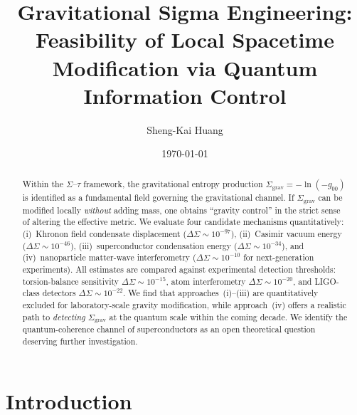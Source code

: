 \documentclass[prd,twocolumn,superscriptaddress,longbibliography,floatfix]{revtex4-2}
\newcommand{\tauasym}{\tau}
\newcommand{\Sgrav}{\Sigma_{\mathrm{grav}}}
\newcommand{\DSigma}{\Delta\Sigma}
\begin{document}
\title{Gravitational Sigma Engineering: Feasibility of Local Spacetime
Modification via Quantum Information Control}

\author{Sheng-Kai Huang}

\date{\today}

\begin{abstract}
Within the $\Sigma$--$\tauasym$ framework, the gravitational entropy
production $\Sgrav = -\ln(-g_{00})$ is identified as a fundamental
field governing the gravitational channel.  If $\Sgrav$ can be
modified locally \emph{without} adding mass, one obtains ``gravity
control'' in the strict sense of altering the effective metric.  We
evaluate four candidate mechanisms quantitatively: (i)~Khronon field
condensate displacement ($\DSigma \sim 10^{-97}$), (ii)~Casimir
vacuum energy ($\DSigma \sim 10^{-46}$), (iii)~superconductor
condensation energy ($\DSigma \sim 10^{-34}$), and (iv)~nanoparticle
matter-wave interferometry ($\DSigma \sim 10^{-10}$ for
next-generation experiments).  All estimates are compared against
experimental detection thresholds: torsion-balance sensitivity
$\DSigma \sim 10^{-15}$, atom interferometry $\DSigma \sim 10^{-20}$,
and LIGO-class detectors $\DSigma \sim 10^{-22}$.  We find that
approaches~(i)--(iii) are quantitatively excluded for laboratory-scale
gravity modification, while approach~(iv) offers a realistic path to
\emph{detecting} $\Sgrav$ at the quantum scale within the coming
decade.  We identify the quantum-coherence channel of superconductors
as an open theoretical question deserving further investigation.
\end{abstract}

\maketitle

\section{Introduction}
\label{sec:intro}
\end{document}
